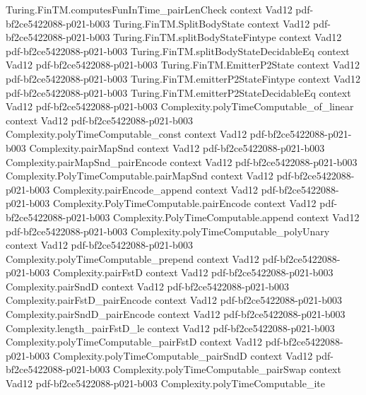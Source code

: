 \begin{theorem}
\proofstep
  {Turing.FinTM.computesFunInTime_pairLenCheck}
  {context}
  {Vad12}
  {pdf-bf2ce5422088-p021-b003}
\proofstep
  {Turing.FinTM.SplitBodyState}
  {context}
  {Vad12}
  {pdf-bf2ce5422088-p021-b003}
\proofstep
  {Turing.FinTM.splitBodyStateFintype}
  {context}
  {Vad12}
  {pdf-bf2ce5422088-p021-b003}
\proofstep
  {Turing.FinTM.splitBodyStateDecidableEq}
  {context}
  {Vad12}
  {pdf-bf2ce5422088-p021-b003}
\proofstep
  {Turing.FinTM.EmitterP2State}
  {context}
  {Vad12}
  {pdf-bf2ce5422088-p021-b003}
\proofstep
  {Turing.FinTM.emitterP2StateFintype}
  {context}
  {Vad12}
  {pdf-bf2ce5422088-p021-b003}
\proofstep
  {Turing.FinTM.emitterP2StateDecidableEq}
  {context}
  {Vad12}
  {pdf-bf2ce5422088-p021-b003}
\proofstep
  {Complexity.polyTimeComputable_of_linear}
  {context}
  {Vad12}
  {pdf-bf2ce5422088-p021-b003}
\proofstep
  {Complexity.polyTimeComputable_const}
  {context}
  {Vad12}
  {pdf-bf2ce5422088-p021-b003}
\proofstep
  {Complexity.pairMapSnd}
  {context}
  {Vad12}
  {pdf-bf2ce5422088-p021-b003}
\proofstep
  {Complexity.pairMapSnd_pairEncode}
  {context}
  {Vad12}
  {pdf-bf2ce5422088-p021-b003}
\proofstep
  {Complexity.PolyTimeComputable.pairMapSnd}
  {context}
  {Vad12}
  {pdf-bf2ce5422088-p021-b003}
\proofstep
  {Complexity.pairEncode_append}
  {context}
  {Vad12}
  {pdf-bf2ce5422088-p021-b003}
\proofstep
  {Complexity.PolyTimeComputable.pairEncode}
  {context}
  {Vad12}
  {pdf-bf2ce5422088-p021-b003}
\proofstep
  {Complexity.PolyTimeComputable.append}
  {context}
  {Vad12}
  {pdf-bf2ce5422088-p021-b003}
\proofstep
  {Complexity.polyTimeComputable_polyUnary}
  {context}
  {Vad12}
  {pdf-bf2ce5422088-p021-b003}
\proofstep
  {Complexity.polyTimeComputable_prepend}
  {context}
  {Vad12}
  {pdf-bf2ce5422088-p021-b003}
\proofstep
  {Complexity.pairFstD}
  {context}
  {Vad12}
  {pdf-bf2ce5422088-p021-b003}
\proofstep
  {Complexity.pairSndD}
  {context}
  {Vad12}
  {pdf-bf2ce5422088-p021-b003}
\proofstep
  {Complexity.pairFstD_pairEncode}
  {context}
  {Vad12}
  {pdf-bf2ce5422088-p021-b003}
\proofstep
  {Complexity.pairSndD_pairEncode}
  {context}
  {Vad12}
  {pdf-bf2ce5422088-p021-b003}
\proofstep
  {Complexity.length_pairFstD_le}
  {context}
  {Vad12}
  {pdf-bf2ce5422088-p021-b003}
\proofstep
  {Complexity.polyTimeComputable_pairFstD}
  {context}
  {Vad12}
  {pdf-bf2ce5422088-p021-b003}
\proofstep
  {Complexity.polyTimeComputable_pairSndD}
  {context}
  {Vad12}
  {pdf-bf2ce5422088-p021-b003}
\proofstep
  {Complexity.polyTimeComputable_pairSwap}
  {context}
  {Vad12}
  {pdf-bf2ce5422088-p021-b003}
\proofstep
  {Complexity.polyTimeComputable_ite}

\end{theorem}
